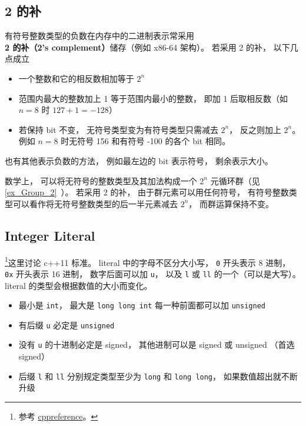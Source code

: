 \subsection{2 的补}
有符号整数类型的负数在内存中的二进制表示常采用 \textbf{2 的补（2's complement）}储存（例如 x86-64 架构）。 若采用 2 的补， 以下几点成立
\begin{itemize}
\item 一个整数和它的相反数相加等于 $2^n$
\item 范围内最大的整数加上 1 等于范围内最小的整数， 即加 1 后取相反数（如 $n = 8$ 时 $127 + 1 = -128$）
\item 若保持 bit 不变， 无符号类型变为有符号类型只需减去 $2^n$， 反之则加上 $2^n$。 例如 $n = 8$ 时无符号 156 和有符号 -100 的各个 bit 相同。
\end{itemize}

也有其他表示负数的方法， 例如最左边的 bit 表示符号， 剩余表示大小。

数学上， 可以将无符号的整数类型及其加法构成一个 $2^n$ 元循环群（见\autoref{ex_Group_2}~）。 若采用 2 的补， 由于群元素可以用任何符号， 有符号整数类型可以看作将无符号整数类型的后一半元素减去 $2^n$， 而群运算保持不变。

\subsection{Integer Literal}
\footnote{参考 \href{https://en.cppreference.com/w/cpp/language/integer_literal}{cppreference}。}这里讨论 c++11 标准。 literal 中的字母不区分大小写， \verb|0| 开头表示 8 进制，  \verb|0x| 开头表示 16 进制， 数字后面可以加 \verb|u|， 以及 \verb|l| 或 \verb|ll| 的一个（可以是大写）。 literal 的类型会根据数值的大小而变化。

\begin{itemize}
\item 最小是 \verb|int|， 最大是 \verb|long long int| 每一种前面都可以加 \verb|unsigned|
\item 有后缀 \verb|u| 必定是 \verb|unsigned|
\item 没有 \verb|u| 的十进制必定是 signed， 其他进制可以是 signed 或 unsigned （首选 signed）
\item 后缀 \verb|l| 和 \verb|ll| 分别规定类型至少为 \verb|long| 和 \verb|long long|， 如果数值超出就不断升级
\end{itemize}

